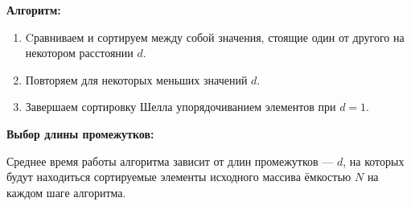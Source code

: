 \documentclass{report}
\begin{document}
\par \textbf{Алгоритм:}

\begin{enumerate}
    \item Cравниваем и сортируем между собой значения, стоящие один от другого на некотором расстоянии ${d}$.
    \item Повторяем для некоторых меньших значений ${d}$.
    \item Завершаем сортировку Шелла упорядочиванием элементов при ${d = 1}$.
\end{enumerate}

\par \textbf{Выбор длины промежутков:}
\par Среднее время работы алгоритма зависит от длин промежутков — ${d}$, на которых будут находиться сортируемые элементы исходного массива ёмкостью ${N}$ на каждом шаге алгоритма.

\newpage

\end{document}
